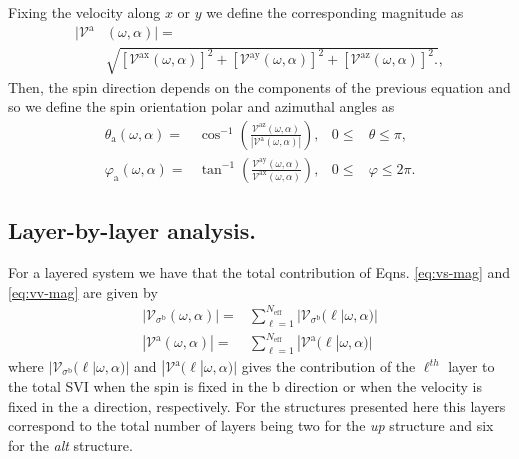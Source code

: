 \documentclass[prb,11pt,tightenlines,twocolumn,aps]{revtex4-1}
\begin{document}
Fixing the velocity along $x$ or $y$ we define the corresponding magnitude as
\begin{align}
|\mathcal{V}^{\mathrm{a}}&(\omega,\alpha)| = \nonumber \\
&\sqrt { 
[\mathcal{V}^{\mathrm{ax}}(\omega,\alpha)]^{2} +
[\mathcal{V}^{\mathrm{ay}}(\omega,\alpha)]^{2} +
[\mathcal{V}^{\mathrm{az}}(\omega,\alpha)]^{2} .
},
\label{eq:vv-mag}
\end{align}
Then, the spin direction depends on the components of the previous equation and
so we define the spin orientation polar and azimuthal angles as
\begin{align}
\theta_{\mathrm{a}}  (\omega,\alpha)
=& 
\cos^{-1} \left( \frac{\mathcal{V}^{\mathrm{az}}(\omega,\alpha)}
{|\mathcal{V}^{\mathrm{a}}(\omega,\alpha)|} \right),
& 0 \leq &\theta \leq \pi, 
\label{eq:polar-ang}
\\
\varphi_{\mathrm{a}} (\omega,\alpha)
=& 
\tan^{-1} \left( \frac{\mathcal{V}^{\mathrm{ay}}(\omega,\alpha)}
{\mathcal{V}^{\mathrm{ax}}(\omega,\alpha)} \right),
& 0 \leq &\varphi \leq 2\pi.
\label{eq:azimuthal-ang} 
\end{align}




\subsection{Layer-by-layer analysis.}\label{sec:theory-layer}

For a layered system we have that the total contribution of Eqns. 
\eqref{eq:vs-mag} and \eqref{eq:vv-mag} are given \cite{arzatePRB14} by 
\begin{align}
|\mathcal{V}_{\sigma^{\mathrm{b}}}(\omega,\alpha)|
=& 
\sum_{\ell=1}^{N_{\mathrm{eff}}}
|\mathcal{V}_{\sigma^{\mathrm{b}}} (\ell | \omega,\alpha)|
\label{eq:vs-layer}
\\
|\mathcal{V}^{\mathrm{a}}(\omega,\alpha)|
=&
\sum_{\ell=1}^{N_{\mathrm{eff}}}
|\mathcal{V}^{\mathrm{a}} (\ell | \omega,\alpha)|
\label{eq:vv-layer}
\end{align}
where $|\mathcal{V}_{\sigma^{\mathrm{b}}} (\ell | \omega,\alpha)|$ and
$|\mathcal{V}^{\mathrm{a}} (\ell | \omega,\alpha)|$ gives the contribution of
the $\ell^{th}$ layer to the total SVI when the spin is fixed in the
$\mathrm{b}$ direction or when the velocity is fixed in the $\mathrm{a}$
direction, respectively. For the structures presented here this layers
correspond to the total number of layers being two for the \emph{up} structure
and six for the \emph{alt} structure.
\end{document}
